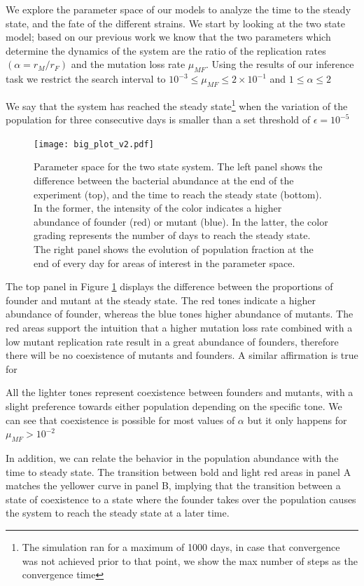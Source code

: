 \documentclass{article}
\begin{document}
We explore the parameter space of our models to analyze the time to the steady state, and the fate of the different strains. We start by looking at the two state model; based on our previous work we know that the two parameters which determine the dynamics of the system are the ratio of the replication rates $(\alpha = r_M / r_F)$ and the mutation loss rate $\mu_{MF}$. Using the results of our inference task we restrict the search interval to $10^{-3} \leq \mu_{MF} \leq 2 \times 10^{-1}$ and $1 \leq \alpha \leq 2$

We say that the system has reached the steady state\footnote{The simulation ran for a maximum of 1000 days, in case that convergence was not achieved prior to that point, we show the max number of steps as the convergence time} when the variation of the population for three consecutive days is smaller than a set threshold of $\epsilon = 10^{-5}$

\begin{figure}[H]
	\centering
	\texttt{[image: big\_plot\_v2.pdf]}
	\caption{Parameter space for the two state system. The left panel shows the difference between the bacterial abundance at the end of the experiment (top), and the time to reach the steady state (bottom). In the former, the intensity of the color indicates a higher abundance of founder (red) or mutant (blue). In the latter, the color grading represents the number of days to reach the steady state. The right panel shows the evolution of population fraction at the end of every day for areas of interest in the parameter space.}
	\label{fig:parameter_space_2st}
\end{figure}

The top panel in Figure \ref{fig:parameter_space_2st} displays the difference between the proportions of founder and mutant at the steady state. The red tones indicate a higher abundance of founder, whereas the blue tones higher abundance of mutants. The red areas support the intuition that a higher mutation loss rate combined with a low mutant replication rate result in a great abundance of founders, therefore there will be no coexistence of mutants and founders. A similar affirmation is true for 

All the lighter tones represent coexistence between founders and mutants, with a slight preference towards either population depending on the specific tone. We can see that coexistence is possible for most values of $\alpha$ but it only happens for $\mu_{MF}>10^{-2}$

In addition, we can relate the behavior in the population abundance with the time to steady state. The transition between bold and light red areas in panel A matches the yellower curve in panel B, implying that the transition between a state of coexistence to a state where the founder takes over the population causes the system to reach the steady state at a later time.
\end{document}
